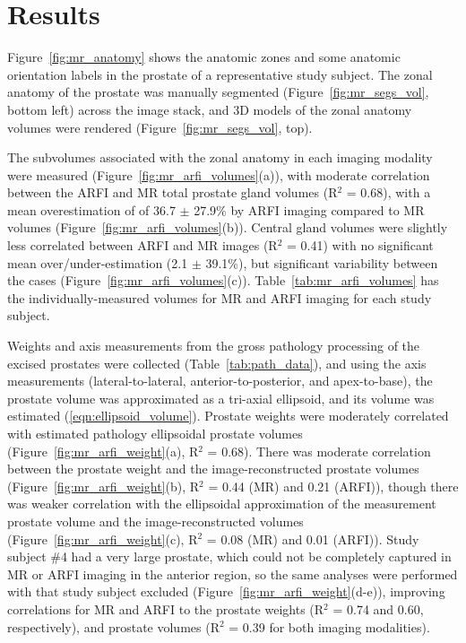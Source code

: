\section{Results}\label{sect:results}

Figure~\ref{fig:mr_anatomy} shows the anatomic zones and some anatomic
orientation labels in the prostate of a representative study subject.  The
zonal anatomy of the prostate was manually segmented
(Figure~\ref{fig:mr_segs_vol}, bottom left) across the image stack, and 3D
models of the zonal anatomy volumes were rendered
(Figure~\ref{fig:mr_segs_vol}, top).





The subvolumes associated with the zonal anatomy in each imaging modality were
measured (Figure~\ref{fig:mr_arfi_volumes}(a)), with moderate correlation
between the ARFI and MR total prostate gland volumes (R$^2$ = 0.68), with a
mean overestimation of of 36.7 $\pm$ 27.9\% by ARFI imaging compared to MR
volumes (Figure~\ref{fig:mr_arfi_volumes}(b)).  Central gland volumes were
slightly less correlated between ARFI and MR images (R$^2$ = 0.41) with no
significant mean over/under-estimation (2.1 $\pm$ 39.1\%), but significant
variability between the cases (Figure~\ref{fig:mr_arfi_volumes}(c)).
Table~\ref{tab:mr_arfi_volumes} has the individually-measured volumes for MR
and ARFI imaging for each study subject.



Weights and axis measurements from the gross pathology processing of the
excised prostates were collected (Table~\ref{tab:path_data}), and using the
axis measurements (lateral-to-lateral, anterior-to-posterior, and
apex-to-base), the prostate volume was approximated as a tri-axial ellipsoid,
and its volume was estimated (\ref{eqn:ellipsoid_volume}).  Prostate weights
were moderately correlated with estimated pathology ellipsoidal prostate
volumes (Figure~\ref{fig:mr_arfi_weight}(a), R$^2$ = 0.68).  There was moderate
correlation between the prostate weight and the image-reconstructed prostate
volumes (Figure~\ref{fig:mr_arfi_weight}(b), R$^2$ = 0.44 (MR) and 0.21
(ARFI)), though there was weaker correlation with the ellipsoidal approximation
of the measurement prostate volume and the image-reconstructed volumes
(Figure~\ref{fig:mr_arfi_weight}(c), R$^2$ = 0.08 (MR) and 0.01 (ARFI)).  Study
subject \#4 had a very large prostate, which could not be completely captured
in MR or ARFI imaging in the anterior region, so the same analyses were
performed with that study subject excluded
(Figure~\ref{fig:mr_arfi_weight}(d-e)), improving correlations for MR and ARFI
to the prostate weights (R$^2$ = 0.74 and 0.60, respectively), and prostate
volumes (R$^2$ = 0.39 for both imaging modalities).

